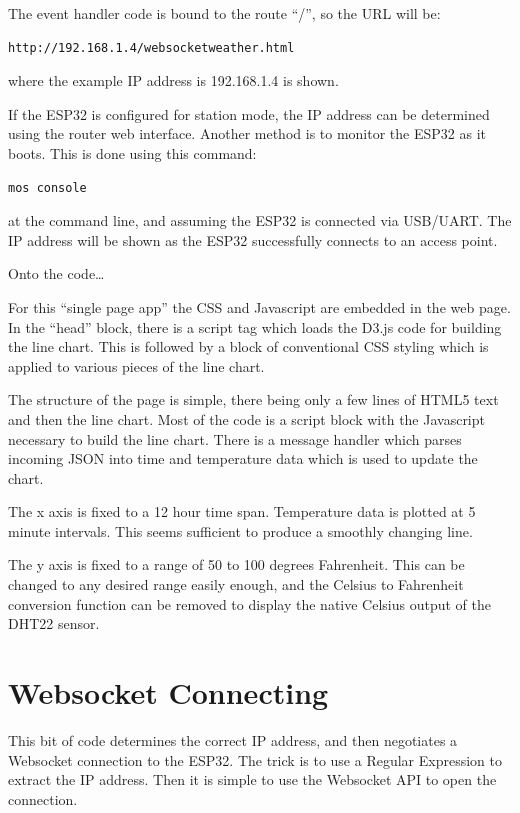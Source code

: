 \documentclass[oneside,letterpaper,12pt]{book}
\begin{document}
The event handler code is bound to the route ``/'', so the URL will be:

\begin{verbatim}
http://192.168.1.4/websocketweather.html
\end{verbatim}

where the example IP address is 192.168.1.4 is shown.

If the ESP32 is configured for station mode, the IP address can be
determined using the router web interface. Another method is to monitor
the ESP32 as it boots. This is done using this command:

\begin{verbatim}
mos console
\end{verbatim}

at the command line, and assuming the ESP32 is connected via USB/UART.
The IP address will be shown as the ESP32 successfully connects to an
access point.

Onto the code\ldots{}

For this ``single page app'' the CSS and Javascript are embedded in the
web page. In the ``head'' block, there is a script tag which loads the
D3.js code for building the line chart. This is followed by a block of
conventional CSS styling which is applied to various pieces of the line
chart.

The structure of the page is simple, there being only a few lines of
HTML5 text and then the line chart. Most of the code is a script block
with the Javascript necessary to build the line chart. There is a
message handler which parses incoming JSON into time and temperature
data which is used to update the chart.

The x axis is fixed to a 12 hour time span. Temperature data is plotted
at 5 minute intervals. This seems sufficient to produce a smoothly
changing line.

The y axis is fixed to a range of 50 to 100 degrees Fahrenheit. This can
be changed to any desired range easily enough, and the Celsius to
Fahrenheit conversion function can be removed to display the native
Celsius output of the DHT22 sensor.

\section{Websocket Connecting}\label{websocket-connecting}

This bit of code determines the correct IP address, and then negotiates
a Websocket connection to the ESP32. The trick is to use a Regular
Expression to extract the IP address. Then it is simple to use the
Websocket API to open the connection.
\end{document}
